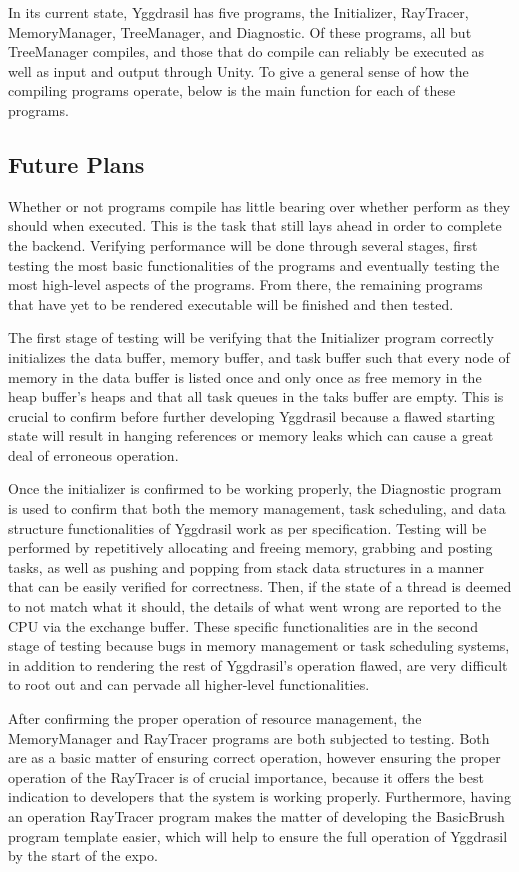 \documentclass[onecolumn, draftclsnofoot,10pt, compsoc]{IEEEtran}
\begin{document}
In its current state, Yggdrasil has five programs, the Initializer, RayTracer, MemoryManager, TreeManager, and Diagnostic. Of these programs, all but TreeManager compiles, and those that do compile can reliably be executed as well as input and output through Unity. To give a general sense of how the compiling programs operate, below is the main function for each of these programs.

\subsection{Future Plans}
Whether or not programs compile has little bearing over whether perform as they should when executed. This is the task that still lays ahead in order to complete the backend. Verifying performance will be done through several stages, first testing the most basic functionalities of the programs and eventually testing the most high-level aspects of the programs. From there, the remaining programs that have yet to be rendered executable will be finished and then tested.

The first stage of testing will be verifying that the Initializer program correctly initializes the data buffer, memory buffer, and task buffer such that every node of memory in the data buffer is listed once and only once as free memory in the heap buffer’s heaps and that all task queues in the taks buffer are empty. This is crucial to confirm before further developing Yggdrasil because a flawed starting state will result in hanging references or memory leaks which can cause a great deal of erroneous operation.

Once the initializer is confirmed to be working properly, the Diagnostic program is used to confirm that both the memory management, task scheduling, and data structure functionalities of Yggdrasil work as per specification. Testing will be performed by repetitively allocating and freeing memory, grabbing and posting tasks, as well as pushing and popping from stack data structures in a manner that can be easily verified for correctness. Then, if the state of a thread is deemed to not match what it should, the details of what went wrong are reported to the CPU via the exchange buffer. These specific functionalities are in the second stage of testing because bugs in memory management or task scheduling systems, in addition to rendering the rest of Yggdrasil’s operation flawed, are very difficult to root out and can pervade all higher-level functionalities.

After confirming the proper operation of resource management, the MemoryManager and RayTracer programs are both subjected to testing. Both are as a basic matter of ensuring correct operation, however ensuring the proper operation of the RayTracer is of crucial importance, because it offers the best indication to developers that the system is working properly. Furthermore, having an operation RayTracer program makes the matter of developing the BasicBrush program template easier, which will help to ensure the full operation of Yggdrasil by the start of the expo.
\end{document}
